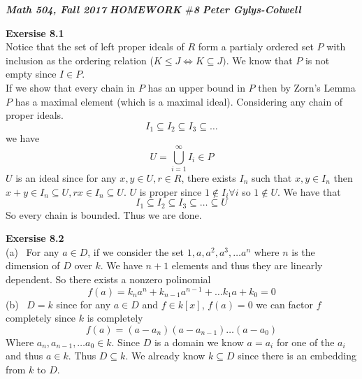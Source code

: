 \documentclass[12pt]{article}
\newenvironment{ques}[1]{\textbf{Exersise #1}\vspace{1 mm}\\ }{\bigskip}
\theoremstyle{definition}
\begin{document}
\noindent \textit{\textbf{Math 504, Fall 2017}} \hspace{1.3cm}
\textit{\textbf{HOMEWORK $\#$8}} \hspace{1.3cm} \textit{\textbf{Peter
Gylys-Colwell}} 

\vspace{1cm}

\begin{ques}{8.1}
	Notice that the set of left proper ideals of $R$ form a partialy ordered
	set $P$ with inclusion as the ordering relation ($K \leq J \Leftrightarrow
	K \subseteq J)$. We know that $P$ is not empty since $I \in P$.\\
	If we show that every chain in $P$ has an upper bound in $P$ then by
	Zorn's Lemma $P$ has a maximal element (which is a maximal ideal).
	Considering any chain of proper ideals.
	$$I_1 \subseteq I_2 \subseteq I_3 \subseteq \dots $$
	we have
	$$U = \bigcup_{i = 1}^\infty I_i \in P$$
	$U$ is an ideal since for any $x,y \in U, r \in R$, there exists $I_n$ such that $x,
	y \in I_n$ then $x + y \in I_n \subseteq U, rx \in I_n \subseteq U$. $U$ is proper
	since $1 \notin I_i \forall i$ so $1 \notin U$. We have that 
	$$I_1 \subseteq I_2 \subseteq I_3 \subseteq \dots \subseteq U$$
	So every chain is bounded. Thus we are done.
\end{ques}

\begin{ques}{8.2}
	(a) \ For any $a \in D$, if we consider the set $1, a, a^2, a^3, \dots
	a^{n}$ where $n$ is the dimension of $D$ over $k$. We have $n+1$ elements
	and thus they are linearly dependent. So there exists a nonzero polinomial 
	$$f(a) = k_{n}a^{n} + k_{n - 1}a^{n - 1} + \dots k_1a + k_0 = 0$$
	(b) \ $D = k$ since for any $a \in D$ and $f \in k[x]$, $f(a) = 0$ we can
	factor $f$ completely since $k$ is completely
	$$f(a) = (a - a_n)(a - a_{n-1}) \dots (a - a_0)$$
	Where $a_n, a_{n-1}, \dots a_0 \in k$. Since $D$ is a domain we know $a =
	a_i$ for one of the $a_i$ and thus $a \in k$. Thus $D \subseteq k$. We
	already know $k \subseteq D$ since there is an embedding from $k$ to $D$.
\end{ques}
\end{document}
